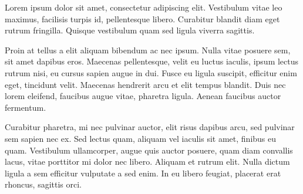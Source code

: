 Lorem ipsum dolor sit amet, consectetur adipiscing elit. Vestibulum vitae leo maximus, facilisis turpis id, pellentesque libero. Curabitur blandit diam eget rutrum fringilla. Quisque vestibulum quam sed ligula viverra sagittis.

Proin at tellus a elit aliquam bibendum ac nec ipsum. Nulla vitae posuere sem, sit amet dapibus eros. Maecenas pellentesque, velit eu luctus iaculis, ipsum lectus rutrum nisi, eu cursus sapien augue in dui. Fusce eu ligula suscipit, efficitur enim eget, tincidunt velit. Maecenas hendrerit arcu et elit tempus blandit. Duis nec lorem eleifend, faucibus augue vitae, pharetra ligula. Aenean faucibus auctor fermentum.

Curabitur pharetra, mi nec pulvinar auctor, elit risus dapibus arcu, sed pulvinar sem sapien nec ex. Sed lectus quam, aliquam vel iaculis sit amet, finibus eu quam. Vestibulum ullamcorper, augue quis auctor posuere, quam diam convallis lacus, vitae porttitor mi dolor nec libero. Aliquam et rutrum elit. Nulla dictum ligula a sem efficitur vulputate a sed enim. In eu libero feugiat, placerat erat rhoncus, sagittis orci.